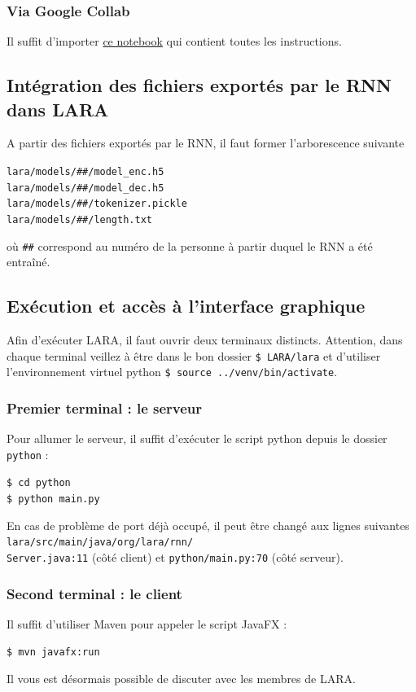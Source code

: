 \documentclass[10pt,a4paper]{article}
\begin{document}
\subsubsection{Via Google Collab}
Il suffit d'importer \href{https://github.com/LaraProject/notebooks/blob/master/LaraProject_RNN.ipynb}{ce notebook} qui contient toutes les instructions.

\subsection{Intégration des fichiers exportés par le RNN dans LARA}
A partir des fichiers exportés par le RNN, il faut former l’arborescence suivante
\begin{center}
	\texttt{lara/models/\#\#/model\_enc.h5} \\
	\texttt{lara/models/\#\#/model\_dec.h5} \\
	\texttt{lara/models/\#\#/tokenizer.pickle} \\
	\texttt{lara/models/\#\#/length.txt}
\end{center}
où \texttt{\#\#} correspond au numéro de la personne à partir duquel le RNN a été entraîné.

\subsection{Exécution et accès à l'interface graphique}
Afin d'exécuter LARA, il faut ouvrir deux terminaux distincts. Attention, dans chaque terminal veillez à être dans le bon dossier \texttt{\$ LARA/lara} et d'utiliser l'environnement virtuel python \texttt{\$ source ../venv/bin/activate}.
\subsubsection{Premier terminal : le serveur}
Pour allumer le serveur, il suffit d’exécuter le script python depuis le dossier \texttt{python} :
\begin{center}
	\texttt{\$ cd python} \\
	\texttt{\$ python main.py}
\end{center}
En cas de problème de port déjà occupé, il peut être changé aux lignes suivantes \texttt{lara/src/main/java/org/lara/rnn/\\Server.java:11} (côté client) et \texttt{python/main.py:70} (côté serveur).
\subsubsection{Second terminal : le client}
Il suffit d'utiliser Maven pour appeler le script JavaFX :
\begin{center}
	\texttt{\$ mvn javafx:run}
\end{center}
Il vous est désormais possible de discuter avec les membres de LARA.
\end{document}
